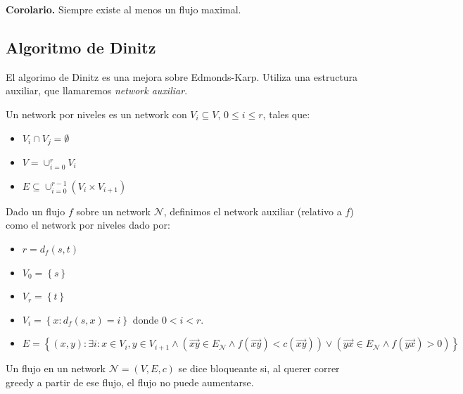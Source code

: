 \documentclass[a4paper]{article}
\begin{document}
\textbf{Corolario.} Siempre existe al menos un flujo maximal.

\subsection{Algoritmo de Dinitz}

El algorimo de Dinitz es una mejora sobre Edmonds-Karp. Utiliza una estructura
auxiliar, que llamaremos \textit{network auxiliar}.

\begin{definition}
    Un network por niveles es un network con $V_i \subseteq V$, $0 \leq i \leq
    r$, tales que: 

    \begin{itemize}
        \item $V_i \cap V_j = \emptyset$ 
        \item $V = \cup_{i=0}^{r} V_i$  
        \item $E \subseteq \cup_{i=0}^{r - 1} \left( V_i \times V_{i+1} \right) $
    \end{itemize}
\end{definition}

\begin{definition}
    Dado un flujo $f$ sobre un network $\mathcal{N}$, definimos el network auxiliar (relativo a $f$) como el network por niveles dado por: 

    \begin{itemize}
        \item $r = d_f(s, t)$ 
        \item $V_0 = \left\{ s \right\} $ 
        \item $V_r = \left\{ t \right\} $
        \item $V_i = \left\{ x : d_f(s, x) = i \right\} $ donde $0 < i < r$.
        \item $E = \left\{ (x, y) : \exists i : x \in V_i, y \in V_{i+1} \land \left( \overrightarrow{xy} \in E_{\mathcal{N}} \land  f(\overrightarrow{xy}) < c(\overrightarrow{xy}) \right) \lor  \left( \overrightarrow{yx} \in E_{\mathcal{N}} \land  f(\overrightarrow{yx}) > 0 \right)   \right\} $
    \end{itemize}
\end{definition}

\begin{definition}
    Un flujo en un network $\mathcal{N} = (V, E, c)$ se dice bloqueante si, al querer correr greedy a partir de ese flujo, el flujo no puede aumentarse.
\end{definition}
\end{document}

